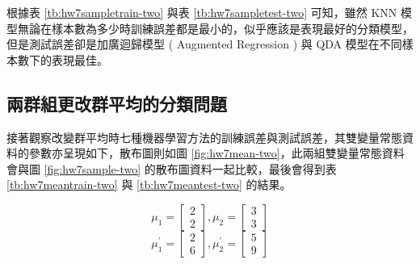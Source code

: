 \renewcommand\arraystretch{1.5}
\begin{table}[h]
\scriptsize
\setlength{\belowcaptionskip}{0pt}
\centering
\caption{七種機器學習方法改變樣本數的兩群組測試資料分類錯誤率}\label{tb:hw7sampletest-two}
\end{table}

根據表 \ref{tb:hw7sampletrain-two} 與表 \ref{tb:hw7sampletest-two} 可知，雖然 KNN 模型無論在樣本數為多少時訓練誤差都是最小的，似乎應該是表現最好的分類模型，但是測試誤差卻是加廣迴歸模型 ( Augmented Regression ) 與 QDA 模型在不同樣本數下的表現最佳。

\subsection{兩群組更改群平均的分類問題}

接著觀察改變群平均時七種機器學習方法的訓練誤差與測試誤差，其雙變量常態資料的參數亦呈現如下，散布圖則如圖 \ref{fig:hw7mean-two}，此兩組雙變量常態資料會與圖 \ref{fig:hw7sample-two} 的散布圖資料一起比較，最後會得到表 \ref{tb:hw7meantrain-two} 與 \ref{tb:hw7meantest-two} 的結果。

$$ \mu_1 = \left[
            \begin{array}{clr}
                2  \\
                2 
            \end{array} \right] ,
            \mu_2 = \left[
            \begin{array}{clr}
                3  \\
                3 
            \end{array} \right]$$ 
$$ \mu_1^{'} = \left[
            \begin{array}{clr}
                2  \\
                6 
            \end{array} \right] ,
            \mu_2^{'} = \left[
            \begin{array}{clr}
                5  \\
                9 
            \end{array} \right]  $$ 

